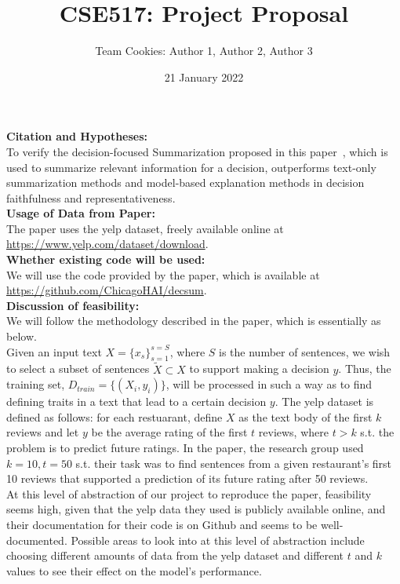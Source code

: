 \documentclass{article}
\title{CSE517: Project Proposal}
\author{Team Cookies: Author 1, Author 2, Author 3}
\date{21 January 2022}
\begin{document}
    \maketitle
    

    \textbf{Citation and Hypotheses:} \\

    To verify the decision-focused Summarization proposed in this paper~\cite{hsu-tan-2021-decision}, which is used to summarize relevant information for a decision,
    outperforms text-only summarization methods and model-based explanation methods in decision faithfulness and representativeness. \\

    \textbf{Usage of Data from Paper:} \\
    The paper uses the yelp dataset, freely available online at \href{https://www.yelp.com/dataset/download}{https://www.yelp.com/dataset/download}. \\

    \textbf{Whether existing code will be used:} \\
    We will use the code provided by the paper, which is available at \href{https://github.com/ChicagoHAI/decsum}{https://github.com/ChicagoHAI/decsum}. \\

    \textbf{Discussion of feasibility:} \\
    We will follow the methodology described in the paper, which is essentially as below. \\

    Given an input text $X = \{x_s\}_{s=1}^{s=S}$, where $S$ is the number of sentences, we wish to select a subset of sentences $\tilde{X}\subset X$
    to support making a decision $y$. Thus, the training set, $D_{train} = \{(X_i, y_i)\}$, will be processed in such a way as to find defining traits in a text that lead to a certain
    decision $y$. The yelp dataset is defined as follows: for each restuarant, define $X$ as the text body of the first $k$ reviews and let $y$ be the average rating of the first $t$
    reviews, where $t > k$ s.t. the problem is to predict future ratings. In the paper, the research group used $k=10, t=50$ s.t. their task was to find sentences from a given
    restaurant's first 10 reviews that supported a prediction of its future rating after 50 reviews. \\

    At this level of abstraction of our project to reproduce the paper, feasibility seems high, given that the yelp data they used is publicly available online, and their documentation
    for their code is on Github and seems to be well-documented. Possible areas to look into at this level of abstraction include choosing different amounts of data from the yelp dataset
    and different $t$ and $k$ values to see their effect on the model's performance. \\
\end{document}
